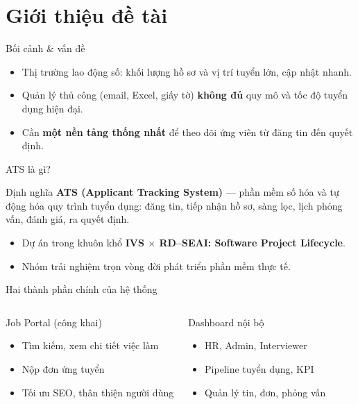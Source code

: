 \section{Giới thiệu đề tài}
\begin{frame}{Bối cảnh \& vấn đề}
  \begin{itemize}
    \item Thị trường lao động số: khối lượng hồ sơ và vị trí tuyển lớn, cập nhật nhanh.
    \item Quản lý thủ công (email, Excel, giấy tờ) \textbf{không đủ} quy mô và tốc độ tuyển dụng hiện đại.
    \item Cần \textbf{một nền tảng thống nhất} để theo dõi ứng viên từ đăng tin đến quyết định.
  \end{itemize}
\end{frame}

\begin{frame}{ATS là gì?}
  \begin{block}{Định nghĩa}
    \textbf{ATS (Applicant Tracking System)} --- phần mềm số hóa và tự động hóa quy trình tuyển dụng:
    đăng tin, tiếp nhận hồ sơ, sàng lọc, lịch phỏng vấn, đánh giá, ra quyết định.
  \end{block}
  \vspace{0.3cm}
  \begin{itemize}
    \item Dự án trong khuôn khổ \textbf{IVS $\times$ RD--SEAI: Software Project Lifecycle}.
    \item Nhóm trải nghiệm trọn vòng đời phát triển phần mềm thực tế.
  \end{itemize}
\end{frame}

\begin{frame}{Hai thành phần chính của hệ thống}
  \begin{columns}[T]
    \begin{block}{Job Portal (công khai)}
      \small
      \begin{itemize}
        \item Tìm kiếm, xem chi tiết việc làm
        \item Nộp đơn ứng tuyển
        \item Tối ưu SEO, thân thiện người dùng
      \end{itemize}
    \end{block}
    \begin{block}{Dashboard nội bộ}
      \small
      \begin{itemize}
        \item HR, Admin, Interviewer
        \item Pipeline tuyển dụng, KPI
        \item Quản lý tin, đơn, phỏng vấn
      \end{itemize}
    \end{block}
  \end{columns}
\end{frame}

